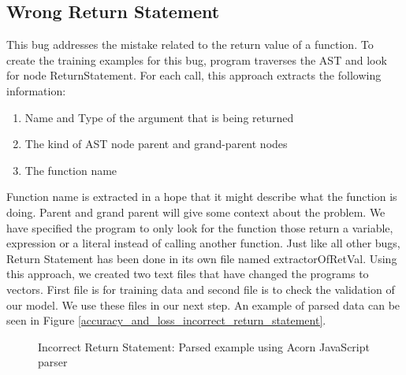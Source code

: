 \documentclass[sigconf]{acmart}
\begin{document}
\subsection{Wrong Return Statement}
This bug addresses the mistake related to the return value of a function. To create the training examples for this bug, program traverses the AST and look for node ReturnStatement. For each call, this approach extracts the following information:
\begin{enumerate}
    \item Name and Type of the argument that is being returned
    \item The kind of AST node parent and grand-parent nodes 
    \item The function name
\end{enumerate}

Function name is extracted in a hope that it might describe what the function is doing. Parent and grand parent will give some context about the problem. We have specified the program to only look for the function those return  a variable, expression or a literal instead of calling another function. Just like all other bugs, Return Statement has been done in its own file named extractorOfRetVal. Using this approach, we created two text files that have changed the programs to vectors. First file is for training data and second file is to check the validation of our model. We use these files in our next step. An example of parsed data can be seen in Figure \ref{accuracy_and_loss_incorrect_return_statement}.
\newline
\begin{figure}[!htb]
    \centering
    \qquad
    \caption{Incorrect Return Statement: Parsed example using Acorn JavaScript parser}%
    
\end{figure}
\end{document}
